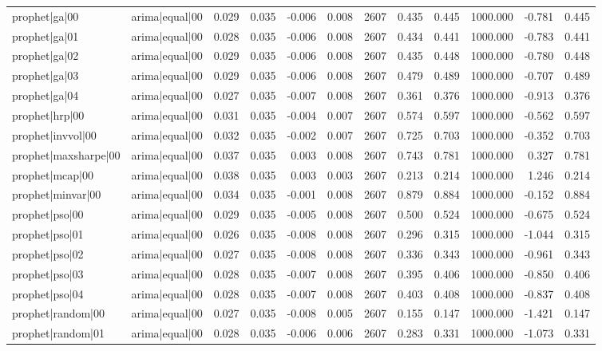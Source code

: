 \begin{table}
\begin{tabular}{llrrrrrrrrrr}
prophet|ga|00 & arima|equal|00 & 0.029 & 0.035 & -0.006 & 0.008 & 2607 & 0.435 & 0.445 & 1000.000 & -0.781 & 0.445 \\
prophet|ga|01 & arima|equal|00 & 0.028 & 0.035 & -0.006 & 0.008 & 2607 & 0.434 & 0.441 & 1000.000 & -0.783 & 0.441 \\
prophet|ga|02 & arima|equal|00 & 0.029 & 0.035 & -0.006 & 0.008 & 2607 & 0.435 & 0.448 & 1000.000 & -0.780 & 0.448 \\
prophet|ga|03 & arima|equal|00 & 0.029 & 0.035 & -0.006 & 0.008 & 2607 & 0.479 & 0.489 & 1000.000 & -0.707 & 0.489 \\
prophet|ga|04 & arima|equal|00 & 0.027 & 0.035 & -0.007 & 0.008 & 2607 & 0.361 & 0.376 & 1000.000 & -0.913 & 0.376 \\
prophet|hrp|00 & arima|equal|00 & 0.031 & 0.035 & -0.004 & 0.007 & 2607 & 0.574 & 0.597 & 1000.000 & -0.562 & 0.597 \\
prophet|invvol|00 & arima|equal|00 & 0.032 & 0.035 & -0.002 & 0.007 & 2607 & 0.725 & 0.703 & 1000.000 & -0.352 & 0.703 \\
prophet|maxsharpe|00 & arima|equal|00 & 0.037 & 0.035 & 0.003 & 0.008 & 2607 & 0.743 & 0.781 & 1000.000 & 0.327 & 0.781 \\
prophet|mcap|00 & arima|equal|00 & 0.038 & 0.035 & 0.003 & 0.003 & 2607 & 0.213 & 0.214 & 1000.000 & 1.246 & 0.214 \\
prophet|minvar|00 & arima|equal|00 & 0.034 & 0.035 & -0.001 & 0.008 & 2607 & 0.879 & 0.884 & 1000.000 & -0.152 & 0.884 \\
prophet|pso|00 & arima|equal|00 & 0.029 & 0.035 & -0.005 & 0.008 & 2607 & 0.500 & 0.524 & 1000.000 & -0.675 & 0.524 \\
prophet|pso|01 & arima|equal|00 & 0.026 & 0.035 & -0.008 & 0.008 & 2607 & 0.296 & 0.315 & 1000.000 & -1.044 & 0.315 \\
prophet|pso|02 & arima|equal|00 & 0.027 & 0.035 & -0.008 & 0.008 & 2607 & 0.336 & 0.343 & 1000.000 & -0.961 & 0.343 \\
prophet|pso|03 & arima|equal|00 & 0.028 & 0.035 & -0.007 & 0.008 & 2607 & 0.395 & 0.406 & 1000.000 & -0.850 & 0.406 \\
prophet|pso|04 & arima|equal|00 & 0.028 & 0.035 & -0.007 & 0.008 & 2607 & 0.403 & 0.408 & 1000.000 & -0.837 & 0.408 \\
prophet|random|00 & arima|equal|00 & 0.027 & 0.035 & -0.008 & 0.005 & 2607 & 0.155 & 0.147 & 1000.000 & -1.421 & 0.147 \\
prophet|random|01 & arima|equal|00 & 0.028 & 0.035 & -0.006 & 0.006 & 2607 & 0.283 & 0.331 & 1000.000 & -1.073 & 0.331 \\

\end{tabular}
\end{table}
